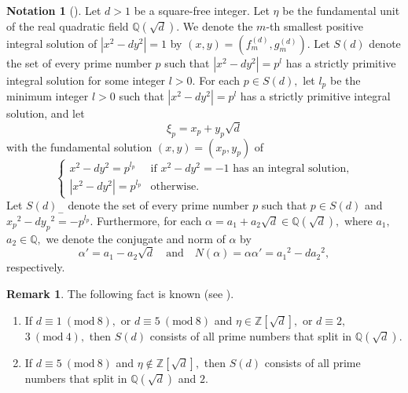 \documentclass{article}
\theoremstyle{definition}
\newtheorem{note}{Notation}
\newtheorem{rmk}{Remark}
\theoremstyle{plain}
\begin{document}
\begin{note}[{\cite[Notation 2]{Hir24}}]
Let $d > 1$ be a square-free integer. 
Let $\eta$ be the fundamental unit of the real quadratic field $\mathbb Q(\sqrt d).$ 
We denote the $m$-th smallest positive integral solution of $|x^2-dy^2| = 1$ by $(x,y) = (f_m^{(d)},g_m^{(d)}).$ 
Let $S(d)$ denote the set of every prime number $p$ such that $|x^2-dy^2| = p^l$ has a strictly primitive integral solution for some integer $l > 0.$ 
For each $p \in S(d),$ let $l_p$ be the minimum integer $l > 0$ such that $|x^2-dy^2| = p^l$ has a strictly primitive integral solution, and let 
\[\xi _p = x_p+y_p\sqrt d\] 
with the fundamental solution $(x,y) = (x_p,y_p)$ of 
\[\begin{cases} 
x^2-dy^2 = p^{l_p} & \text{if }x^2-dy^2 = -1\text{ has an integral solution,} \\ 
|x^2-dy^2| = p^{l_p} & \text{otherwise}. 
\end{cases}\] 
Let $S(d)_-$ denote the set of every prime number $p$ such that $p \in S(d)$ and $x_p{}^2-dy_p{}^2 = -p^{l_p}.$ 
Furthermore, for each $\alpha = a_1+a_2\sqrt d \in \mathbb Q(\sqrt d),$ where $a_1,$ $a_2 \in \mathbb Q,$ we denote the conjugate and norm of $\alpha$ by 
\[\alpha ' = a_1-a_2\sqrt d \quad\text{and}\quad  N(\alpha ) = \alpha\alpha ' = a_1{}^2-da_2{}^2,\] 
respectively.
\end{note}
\begin{rmk}
The following fact is known (see \cite[Theorem 8]{Hir24}).
\begin{enumerate}
\item[\textup{(1)}]
If $d \equiv 1\ (\mathrm{mod}\ 8),$ or $d \equiv 5\ (\mathrm{mod}\ 8)$ and $\eta \in \mathbb Z[\sqrt d],$ or $d \equiv 2,$ $3\ (\mathrm{mod}\ 4),$ then $S(d)$ consists of all prime numbers that split in $\mathbb Q(\sqrt d).$
\item[\textup{(2)}]
If $d \equiv 5\ (\mathrm{mod}\ 8)$ and $\eta \notin \mathbb Z[\sqrt d],$ then $S(d)$ consists of all prime numbers that split in $\mathbb Q(\sqrt d)$ and $2.$
\end{enumerate}
\end{rmk}
\end{document}
